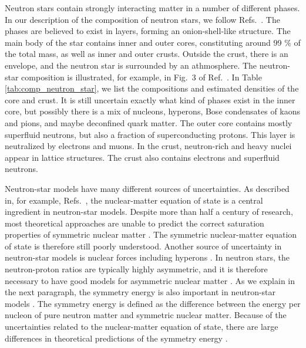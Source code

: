 \documentclass[a4paper,12pt]{report}
\begin{document}
Neutron stars contain strongly interacting matter in a number 
of different phases. In our description of the composition of
neutron stars, we follow Refs.~\cite{heiselberg,lattimer2004}. 
The phases are believed to exist in layers, forming an 
onion-shell-like structure. The main body of the star 
contains inner and outer cores,
constituting around 99 $\%$ of the total mass, as well as 
inner and outer crusts. Outside the crust, there is an 
envelope, and the neutron star is surrounded by an 
athmosphere. The neutron-star composition is illustrated, 
for example, in Fig.~3 of 
Ref.~\cite{lattimer2004}. In Table \ref{tab:comp_neutron_star},
we list the compositions and estimated densities of the core 
and crust. It is still uncertain exactly what 
kind of phases exist in the inner core, but possibly there is 
a mix of nucleons, hyperons, Bose condensates of kaons and 
pions, and maybe deconfined quark matter. 
The outer core contains mostly superfluid neutrons, but
also a fraction of superconducting protons. This layer is
neutralized by electrons and muons. In the crust, neutron-rich 
and heavy nuclei appear in lattice structures. The crust
also contains electrons and superfluid neutrons. 

Neutron-star models have many different sources of 
uncertainties. As described in, for example, 
Refs.~\cite{akmal1998,heiselberg}, the nuclear-matter 
equation of state is a central ingredient in neutron-star
models. Despite more than half a century of research,
most theoretical approaches are unable to predict the
correct saturation properties of symmetric nuclear
matter \cite{akmal1998,heiselberg,frick2003,li2006,
gandolfi2007,soma2008,dalen2009,hebeler2011,baldo2012,
sammarruca2012,carbone2013,hagen2014}. The 
symmetric nuclear-matter equation of state is therefore
still poorly understood. Another source of uncertainty 
in neutron-star models is nuclear forces including hyperons 
\cite{heiselberg,beane2012}. In neutron stars, the 
neutron-proton ratios are typically highly asymmetric,
and it is therefore necessary to have good models for 
asymmetric nuclear matter \cite{heiselberg}. As we explain 
in the next paragraph, the symmetry energy is also important in
neutron-star models \cite{horowitz2014}. The symmetry 
energy is defined as the difference between the energy per 
nucleon of pure neutron matter and symmetric nuclear matter. 
Because of the uncertainties related to the nuclear-matter 
equation of state, there are large differences in theoretical 
predictions of the symmetry energy \cite{muther1987,
engvik1997,lee1998,li2006,vidana2009,carbone2012}. 
\end{document}
